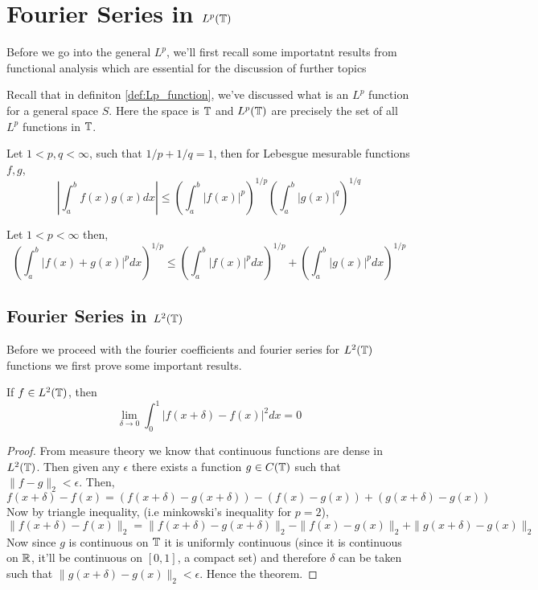 \newpage
\section{Fourier Series in $L^p(\mathbb T)$}
Before we go into the general $L^p$, we'll first recall some importatnt results from functional analysis which are essential for the discussion of further topics

Recall that in definiton \ref{def:Lp_function}, we've discussed what is an $L^p$ function for a general space $S$. Here the space is $\mathbb T$ and $L^p(\mathbb T)$ are precisely the set of all $L^p$ functions in $\mathbb T$.

\begin{theorem}
  \label{thm:Holder_inequality_for_integrals}
  Let $1 < p, q < \infty$, such that $1/p + 1/q = 1$, then for Lebesgue mesurable functions $f, g$,
  $$ \left| \int_a^b f(x)g(x) dx \right| \le \left(\int_a^b |f(x)|^p \right)^{1/p} \left(\int_a^b |g(x)|^q \right)^{1/q}$$
\end{theorem}

\begin{theorem}
  \label{thm:Minkowski_inequality_for_integrals}
 Let $1 < p < \infty$ then, 
  $$\left(\int_a^b |f(x) + g(x)|^p dx \right)^{1/p} \le \left( \int_a^b |f(x)|^p dx \right)^{1/p} + \left( \int_a^b |g(x)|^p dx \right)^{1/p}$$
\end{theorem}


\subsection{Fourier Series in $L^2(\mathbb T)$}
Before we proceed with the fourier coefficients and fourier series for $L^2(\mathbb T)$ functions we first prove some important results.
\begin{theorem}
  \label{thm:L2_functions_are_continuous_in_L2_norm}
  If $f \in L^2(\mathbb T)$, then
  \begin{displaymath}
   \lim_{\delta \to 0} \int_0^1 |f(x+\delta) - f(x)|^2 dx = 0
  \end{displaymath}
\end{theorem}
\begin{proof}
  From measure theory we know that continuous functions are dense in $L^2(\mathbb T)$. Then given any $\epsilon$ there exists a function $g\in C(\mathbb T)$ such that $\|f-g\|_2 < \epsilon$. Then,
  $$ f(x+\delta) - f(x) = (f(x+\delta) - g(x+\delta)) - (f(x) - g(x)) + ( g(x+\delta) - g(x))$$
  Now by triangle inequality, (i.e minkowski's inequality for $p = 2$), 
  $$ \|f(x+\delta) - f(x)\|_2 = \|f(x+\delta) - g(x+\delta)\|_2 - \|f(x) - g(x)\|_2 + \|g(x+\delta) - g(x)\|_2$$
  Now since $g$ is continuous on $\mathbb T$ it is uniformly continuous (since it is continuous on $\mathbb R$, it'll be continuous on $[0,1]$, a compact set) and therefore $\delta$ can be taken such that $\|g(x+\delta) - g(x) \|_2 < \epsilon$. Hence the theorem.
\end{proof}

